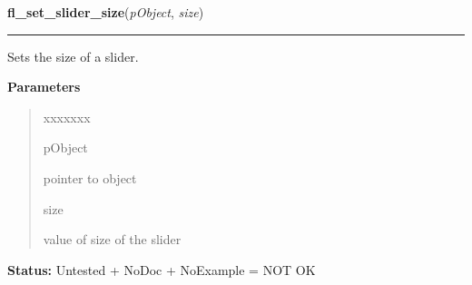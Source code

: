    \label{xformslib:library:fl_set_slider_size}

    \vspace{0.5ex}

\hspace{.8\funcindent}\begin{boxedminipage}{\funcwidth}

    \raggedright \textbf{fl\_set\_slider\_size}(\textit{pObject}, \textit{size})

    \vspace{-1.5ex}

    \rule{\textwidth}{0.5\fboxrule}
\setlength{\parskip}{2ex}
    Sets the size of a slider.

\setlength{\parskip}{1ex}
      \textbf{Parameters}
      \vspace{-1ex}

      \begin{quote}
        \begin{Ventry}{xxxxxxx}

          \item[pObject]

          pointer to object

          \item[size]

          value of size of the slider

        \end{Ventry}

      \end{quote}

\textbf{Status:} Untested + NoDoc + NoExample = NOT OK



    \end{boxedminipage}

    \label{xformslib:library:fl_set_slider_precision}

    \vspace{0.5ex}

